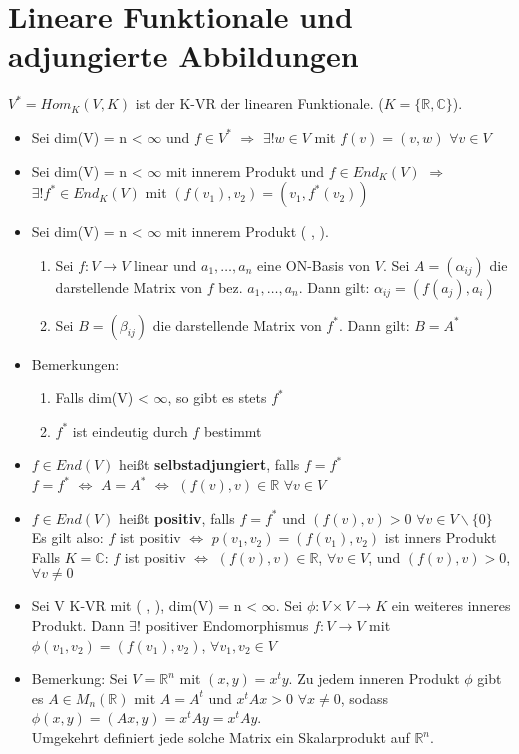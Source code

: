 \section{Lineare Funktionale und adjungierte Abbildungen}
$V^* = Hom_K(V,K)$ ist der K-VR der linearen Funktionale. ($K = \{\mathbb{R}, \mathbb{C}\}$).
\begin{itemize}
\item Sei dim(V) = n < $\infty$ und $f \in V^*$ $\Rightarrow$ $\exists ! w \in V$ mit $f(v) = (v,w)$ $\forall v \in V$
\item Sei dim(V) = n < $\infty$ mit innerem Produkt und $ f \in End_K(V)$ $\Rightarrow$ $\exists ! f^* \in End_K(V)$ mit $(f(v_1), v_2) = (v_1, f^*(v_2))$
\item Sei dim(V) = n < $\infty$ mit innerem Produkt ( , ).
\begin{enumerate}
\item Sei $f: V \to V$ linear und $a_1, …, a_n$ eine ON-Basis von $V$. Sei $A = (\alpha_{ij})$ die darstellende Matrix von $f$ bez. $a_1, …, a_n$. Dann gilt: $\alpha_{ij} = (f(a_j), a_i)$
\item Sei $B = (\beta_{ij})$ die darstellende Matrix von $f^*$. Dann gilt: $B = A^*$
\end{enumerate}
\item Bemerkungen:
\begin{enumerate}
\item Falls dim(V) < $\infty$, so gibt es stets $f^*$
\item $f^*$ ist eindeutig durch $f$ bestimmt
\end{enumerate}
\item $f \in End(V)$ heißt \textbf{selbstadjungiert}, falls $f = f^*$\\
$f = f^*$ $\Leftrightarrow$ $A = A^*$ $\Leftrightarrow$ $(f(v), v) \in \mathbb{R}$ $\forall v \in V$
\item $f \in End(V)$ heißt \textbf{positiv}, falls $f= f^*$ und $(f(v), v) > 0$ $\forall v \in V \backslash \{0\}$\\
Es gilt also: $f$ ist positiv $\Leftrightarrow$ $p(v_1, v_2) = (f(v_1), v_2)$ ist inners Produkt\\
Falls $K = \mathbb{C}$: $f$ ist positiv $\Leftrightarrow$ $(f(v), v) \in \mathbb{R}$, $\forall v \in V$, und $(f(v), v) > 0$, $\forall v \neq 0$
\item Sei V K-VR mit ( , ), dim(V) = n < $\infty$. Sei $\phi: V \times V \to K$ ein weiteres inneres Produkt. Dann $\exists !$ positiver Endomorphismus $f: V \to V$ mit $\phi(v_1, v_2) = (f(v_1), v_2)$, $\forall v_1, v_2 \in V$
\item Bemerkung: Sei $V = \mathbb{R}^n$ mit $(x, y) = x^ty$. Zu jedem inneren Produkt $\phi$ gibt es $A \in M_n(\mathbb{R})$ mit $A = A^t$ und $x^tAx > 0$ $\forall x \neq 0$, sodass $\phi (x, y) = (Ax, y) = x^tAy = x^tAy$.\\
Umgekehrt definiert jede solche Matrix ein Skalarprodukt auf $\mathbb{R}^n$.
\end{itemize}

